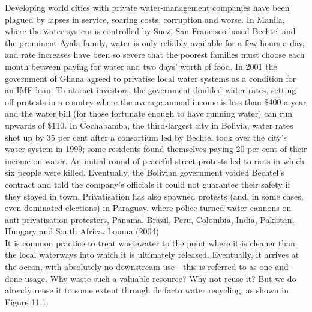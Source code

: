 Developing world cities with private water-management companies have been plagued by lapses in service, soaring costs, corruption and worse. In Manila, where the water system is controlled by Suez, San Francisco-based Bechtel and the prominent Ayala family, water is only reliably available for a few hours a day, and rate increases have been so severe that the poorest families must choose each month between paying for water and two days’ worth of food. In 2001 the government of Ghana agreed to privatise local water systems as a condition for an IMF loan. To attract investors, the government doubled water rates, setting off protests in a country where the average annual income is less than \$400 a year and the water bill (for those fortunate enough to have running water) can run upwards of \$110. In Cochabamba, the third-largest city in Bolivia, water rates shot up by 35 per cent after a consortium led by Bechtel took over the city’s water system in 1999; some residents found themselves paying 20 per cent of their income on water. An initial round of peaceful street protests led to riots in which six people were killed. Eventually, the Bolivian government voided Bechtel’s contract and told the company’s officials it could not guarantee their safety if they stayed in town. Privatisation has also spawned protests (and, in some cases, even dominated elections) in Paraguay, where police turned water cannons on anti-privatisation protesters, Panama, Brazil, Peru, Colombia, India, Pakistan, Hungary and South Africa.
Louma (2004)\\

It is common practice to treat wastewater to the point where it is cleaner than the local waterways into which it is ultimately released. Eventually, it arrives at the ocean, with absolutely no downstream use—this is referred to as one-and-done usage. Why waste such a valuable resource? Why not reuse it? But we do already reuse it to some extent through de facto water recycling, as shown in Figure 11.1.\\


